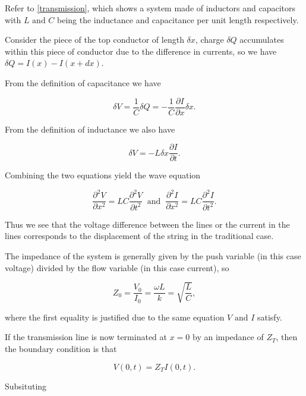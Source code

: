\documentclass[a4paper,12pt]{report}
\begin{document}
{Refer to \cref{transmission}, which shows a system made of inductors and capacitors with \(L \text { and } C\) being the inductance and capacitance per unit length respectively. }
{Consider the piece of the top conductor of length \(\delta x\), charge \(\delta Q\) accumulates within this piece of conductor due to the difference in currents, so we have \(\delta Q = I(x) - I(x+dx)\).

From the definition of capacitance we have

\begin{equation}
	\delta V = \frac{1}{C} \delta Q = -\frac{1}{C} \frac{\partial I}{\partial x} \delta x. 
\end{equation}

From the definition of inductance we also have

\begin{equation}
	\delta V = -L \delta x \frac{\partial I}{\partial t}.
\end{equation}

Combining the two equations yield the wave equation 

\begin{equation}
	\frac{\partial^2 V}{\partial x^2} = LC \frac{\partial^2 V}{\partial t^2} ~\text { and }~ \frac{\partial^2 I}{\partial x^2} = LC \frac{\partial^2 I}{\partial t^2}. 
\end{equation}

Thus we see that the voltage difference between the lines or the current in the lines corresponds to the displacement of the string in the traditional case.

The impedance of the system is generally given by the push variable (in this case voltage) divided by the flow variable (in this case current), so 

\begin{equation}
	Z_0  = \frac{V_0}{I_0 } = \frac{\omega L}{k} = \sqrt{\frac{L}{C} },   
\end{equation}

where the first equality is justified due to the same equation \(V \text { and }  I\) satisfy. 

If the transmission line is now terminated at \(x=0\) by an impedance of \(Z_{T} \), then the boundary condition is that 

\begin{equation}
	V(0,t) = Z_{T} I(0,t).
\end{equation}

Subsituting 

}
\end{document}
